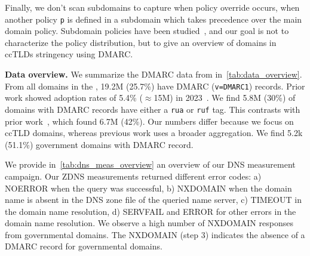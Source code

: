 Finally, we don't scan subdomains to capture when policy override occurs, \ie when another policy \texttt{p} is defined in a subdomain which takes precedence over the main domain policy.
Subdomain policies have been studied~\cite{MaroofiEtAl_AdoptionEmailAntiSpoofing_2021}, and our goal is not to characterize the policy distribution, but to give an overview of domains in \glspl{ccTLD} stringency using \gls{DMARC}.


\textbf{Data overview.}
We summarize the \gls{DMARC} data from \openintel in~\cref{tab:data_overview}.
From all domains in the \dataset, 19.2M (25.7\%) have \gls{DMARC} (\texttt{v=DMARC1}) records. Prior work showed adoption rates of 5.4\% ($\approx$15M) in 2023~\cite{hureau_spoofed}.
We find 5.8M (30\%) of domains with \gls{DMARC} records have either a \texttt{rua} or \texttt{ruf} tag. This contrasts with prior work~\cite{hureau_spoofed}, which found 6.7M (42\%).
Our numbers differ because we focus on \gls{ccTLD} domains, whereas previous work uses a broader \dataset aggregation.
We find 5.2k (51.1\%) government domains with \gls{DMARC} record.

We provide in~\cref{tab:dns_meas_overview} an overview of our \gls{DNS} measurement campaign. Our ZDNS measurements returned different error codes: a) NOERROR when the query was successful, b) NXDOMAIN when the domain name is absent in the DNS zone file of the queried name server, c) TIMEOUT in the domain name resolution, d) SERVFAIL and ERROR for other errors in the domain name resolution. We observe a high number of NXDOMAIN responses from governmental domains. The NXDOMAIN (step 3) indicates the absence of a \gls{DMARC} record for governmental domains.
